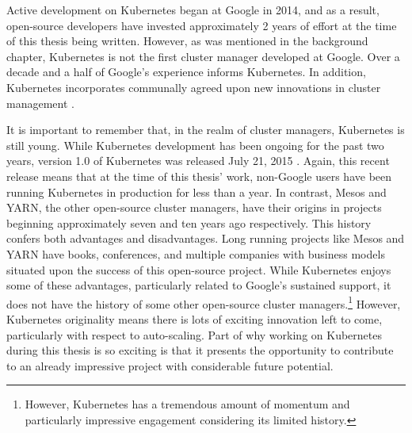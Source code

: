 Active development on Kubernetes began at Google in 2014, and as a result,
open-source developers have invested approximately 2 years of effort at the time
of this thesis being written. However,
as was mentioned in the background chapter, Kubernetes is not the first cluster
manager developed at Google. Over a decade and a half of Google's experience
informs Kubernetes. In addition, Kubernetes incorporates communally agreed upon new
innovations in cluster management \cite{what-is-k8s}.

It is important to remember that, in the realm of cluster managers, Kubernetes
is still young. While Kubernetes development has been ongoing for the past two
years, version 1.0 of Kubernetes was released July 21, 2015
\cite{k8s-v1-release}. Again, this recent release means that at the time of this
thesis' work, non-Google users have been running Kubernetes in production for
less than a year. In contrast, Mesos and YARN, the other open-source cluster
managers, have their origins in projects beginning approximately seven and ten years
ago respectively. This history confers both advantages and disadvantages. Long
running projects like Mesos and YARN have books, conferences, and multiple
companies with business models situated upon the success of this open-source
project. While Kubernetes enjoys some of these advantages, particularly related
to Google's sustained support, it does not have the history of some other
open-source cluster managers.\footnote{However, Kubernetes has a tremendous
amount of momentum and particularly impressive engagement considering its
limited history.} However, Kubernetes originality means there is lots of
exciting innovation left to come, particularly with respect to auto-scaling.
Part of why working on Kubernetes during this thesis is so exciting is that it
presents the opportunity to contribute to an already impressive project with
considerable future potential.
